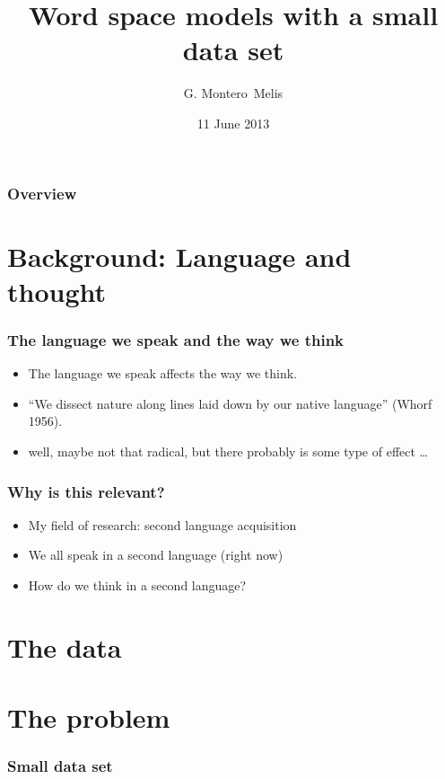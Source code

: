 \documentclass[]{beamer}
\title{
Word space models with a small data set
}
\author{G. Montero~Melis}
\institute{Centre for Research on Bilingualism \\Stockholm University}
\date{11 June 2013}
\begin{document}


\begin{frame}[fragile]
	\maketitle
\end{frame}


\begin{frame}
	\frametitle{Overview}
	\tableofcontents
\end{frame}



\section{Background: Language and thought}

\begin{frame}
	\frametitle{The language we speak and the way we think}
	\begin{itemize}
		\item The language we speak affects the way we think.\pause
		\item ``We dissect nature along lines laid down by our native language'' (Whorf 1956).\pause
		\item well, maybe not that radical, but there probably is some type of effect \ldots
	\end{itemize}
\end{frame}



\begin{frame}
	\frametitle{Why is this relevant?}
	\begin{itemize}
		\item My field of research: second language acquisition
		\item We all speak in a second language (right now)
		\item How do we think in a second language?
	\end{itemize}
\end{frame}



\begin{frame}
	\frametitle{}
\end{frame}


\section{The data}

\begin{frame}
	\frametitle{}
\end{frame}


\section{The problem}

\begin{frame}
	\frametitle{Small data set}
\end{frame}
\end{document}
